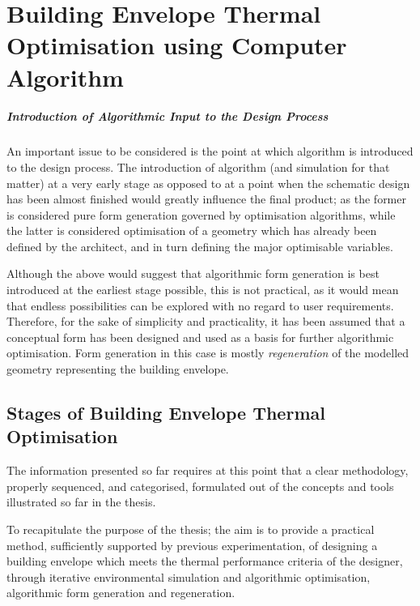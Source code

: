 \chapter{Building Envelope Thermal Optimisation using Computer Algorithm}

\paragraph{Introduction of Algorithmic Input to the Design Proces\mbox{}\vspace{-0.3cm}s}\mbox{}

An important issue to be considered is the point at which algorithm is introduced to the design process. The introduction of algorithm (and simulation for that matter) at a very early stage as opposed to at a point when the schematic design has been almost finished would greatly influence the final product; as the former is considered pure form generation governed by optimisation algorithms, while the latter is considered optimisation of a geometry which has already been defined by the architect, and in turn defining the major optimisable variables.

Although the above would suggest that algorithmic form generation is best introduced at the earliest stage possible, this is not practical, as it would mean that endless possibilities can be explored with no regard to user requirements. Therefore, for the sake of simplicity and practicality, it has been assumed that a conceptual form has been designed and used as a basis for further algorithmic optimisation. Form generation in this case is mostly \emph{regeneration} of the modelled geometry representing the building envelope.

\section{Stages of Building Envelope Thermal Optimisation}

The information presented so far requires at this point that a clear methodology, properly sequenced, and categorised, formulated out of the concepts and tools illustrated so far in the thesis.

To recapitulate the purpose of the thesis; the aim is to provide a practical method, sufficiently supported by previous experimentation, of designing a building envelope which meets the thermal performance criteria of the designer, through iterative environmental simulation and algorithmic optimisation, algorithmic form generation and regeneration.

